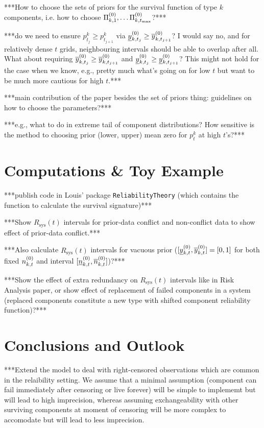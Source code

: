 \documentclass[authoryear, 12pt, a4paper]{elsarticle}
\newcommand{\Rsys}{R_\text{sys}}
\def\tmax{t_\text{max}}
\begin{document}
***How to choose the sets of priors for the survival function of type $k$ components,
i.e. how to choose $\PkZi{1}, \ldots \PkZi{\tmax}$?***

***do we need to ensure $p^k_{t_j} \ge p^k_{t_{j+1}}$ via $\underline{y}^{(0)}_{k,t_j} \ge \overline{y}^{(0)}_{k,t_{j+1}}$?
I would say no, and for relatively dense $t$ grids, neighbouring intervals should be able to overlap after all.
What about requiring $\overline{y}^{(0)}_{k,t_j} \ge \overline{y}^{(0)}_{k,t_{j+1}}$ and $\underline{y}^{(0)}_{k,t_j} \ge \underline{y}^{(0)}_{k,t_{j+1}}$?
This might not hold for the case when we know, e.g., pretty much what's going on for low $t$
but want to be much more cautious for high $t$.***

***main contribution of the paper besides the set of priors thing:
guidelines on how to choose the parameters?***

***e.g., what to do in extreme tail of component distributions?
How sensitive is the method to choosing prior (lower, upper) mean zero for $p^k_t$ at high $t$'s?***


\section{Computations \& Toy Example}

***publish code in Louis' package \texttt{ReliabilityTheory}
(which contains the function to calculate the survival signature)***

***Show $\Rsys(t)$ intervals for prior-data conflict and non-conflict data
to show effect of prior-data conflict.***

***Also calculate $\Rsys(t)$ intervals for vacuous prior
($[\underline{y}^{(0)}_{k,t}, \overline{y}^{(0)}_{k,t}] = [0,1]$ for both fixed $n^{(0)}_{k,t}$ and interval $[\underline{n}^{(0)}_{k,t}, \overline{n}^{(0)}_{k,t}]$)?***

***Show the effect of extra redundancy on $\Rsys(t)$ intervals like in Risk Analysis paper,
or show effect of replacement of failed components in a system
(replaced components constitute a new type with shifted component reliability function)?***


\section{Conclusions and Outlook}

***Extend the model to deal with right-censored observations which are common in the relaibility setting.
We assume that a minimal assumption (component can fail immediately after censoring or live forever)
will be simple to implememt but will lead to high imprecision,
whereas assuming exchangeability with other surviving components at moment of censoring
will be more complex to accomodate but will lead to less imprecision.
\end{document}
